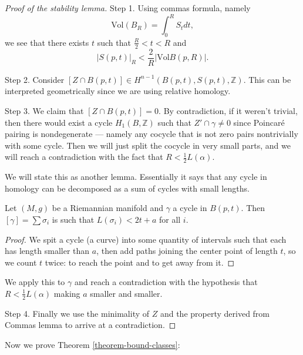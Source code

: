 \begin{proof}[Proof of the stability lemma]
\medskip\noindent
Step 1. Using commas formula, namely
$$
\text{Vol}(B_R)=\int_0^R S_tdt,
$$
we see that there exists $t$ such that $\frac{R}{2}<t<R$ and
$$
|S(p,t)|_R< \frac{2}{R}|\text{Vol}B(p,R)|.
$$

\medskip\noindent
Step 2. Consider
$[Z \cap B(p,t)] \in H^{n-1}(B(p,t),S(p,t),\mathbb{Z})$.
This can be interpreted geometrically since we are using relative homology.

\medskip\noindent
Step 3. We claim that $[Z \cap B(p,t)]=0$.
By contradiction,
if it weren't trivial, then there would exist a cycle $H_1(B,\mathbb{Z})$
such that $Z' \cap \gamma \neq 0$ since Poincaré pairing is nondegenerate ---
namely any cocycle that is not zero pairs nontrivially with some cycle.
Then we will just split the cocycle in very small parts,
and we will reach a contradiction with the fact that
$R<\frac{1}{2}L(\alpha)$.

We will state this as another lemma. Essentially it says that any
cycle in homology can be decomposed as a sum of cycles
with small lengths.

\begin{lemma}
\label{lemma-curve-factoring-gromov}
Let $(M,g)$ be a Riemannian manifold and
$\gamma$ a cycle in $B(p,t)$.
Then $[\gamma]=\sum \sigma_i$ is such that
 $L(\sigma_i)<2t+a$ for all $i$.
\end{lemma}

\begin{proof}
We spit a cycle (a curve) into some quantity of intervals
such that each has length smaller than $a$,
then add paths joining the center point of length $t$,
so we count $t$ twice: to reach the point and to get away from it.
\end{proof}

\noindent
We apply this to $\gamma$ and reach a contradiction
with the hypothesis that $R<\frac{1}{2}L(\alpha)$ making $a$ smaller and
smaller.

\medskip\noindent
Step 4. Finally we use the minimality of $Z$ and the property
derived from Commas lemma to arrive at a contradiction.
\end{proof}

\noindent
Now we prove Theorem \ref{theorem-bound-classes}:

